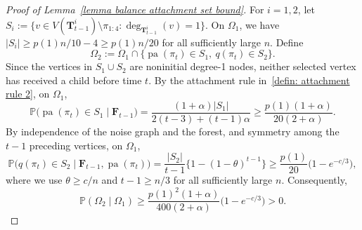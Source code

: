 \documentclass[twoside,11pt]{article}
\theoremstyle{remark}
\begin{document}
\begin{proof}[Proof of Lemma~\ref{lemma balance attachment set bound}]
For $i=1,2$, let
$S_i:=\{v\in V(\bm T^i_{t-1})\setminus\pi_{1:4}:
\operatorname{deg}_{\bm T^i_{t-1}}(v)=1\}$.
On $\Omega_1$, we have $|S_i|\geq p(1)n/10-4\geq p(1)n/20$
for all sufficiently large $n$.
Define
%
\begin{equation*}
\Omega_2:=\Omega_1\cap
\bigl\{\operatorname{pa}(\pi_t)\in S_1,\ q(\pi_t)\in S_2\bigr\}.
\end{equation*}
%
Since the vertices in $S_1\cup S_2$ are noninitial degree-1 nodes,
neither selected vertex has received a child before time $t$.
By the attachment rule in~\eqref{defin: attachment rule 2}, on $\Omega_1$,
%
\begin{equation*}
\mathbb P\bigl(\operatorname{pa}(\pi_t)\in S_1\mid\bm F_{t-1}\bigr)
=\frac{(1+\alpha)|S_1|}{2(t-3)+(t-1)\alpha}
\geq\frac{p(1)(1+\alpha)}{20(2+\alpha)}.
\end{equation*}
%
By independence of the noise graph and the forest, and symmetry
among the $t-1$ preceding vertices, on $\Omega_1$,
%
\begin{equation*}
\mathbb P\bigl(q(\pi_t)\in S_2\mid\bm F_{t-1},
\operatorname{pa}(\pi_t)\bigr)
=\frac{|S_2|}{t-1}\bigl\{1-(1-\theta)^{t-1}\bigr\}
\geq\frac{p(1)}{20}\bigl(1-e^{-c/3}\bigr),
\end{equation*}
%
where we use $\theta\geq c/n$ and $t-1\geq n/3$ for all
sufficiently large $n$.
Consequently,
%
\begin{equation*}
\mathbb P(\Omega_2\mid\Omega_1)
\geq\frac{p(1)^2(1+\alpha)}{400(2+\alpha)}
\bigl(1-e^{-c/3}\bigr)>0.
\end{equation*}
%


\end{proof}
\end{document}
